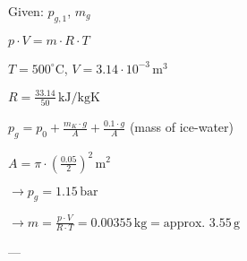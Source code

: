 Given: \( p_{g,1} \), \( m_g \)  

\( p \cdot V = m \cdot R \cdot T \)  

\( T = 500^\circ \text{C} \), \( V = 3.14 \cdot 10^{-3} \, \text{m}^3 \)  

\( R = \frac{33.14}{50} \, \text{kJ/kgK} \)  

\( p_g = p_0 + \frac{m_K \cdot g}{A} + \frac{0.1 \cdot g}{A} \) (mass of ice-water)  

\( A = \pi \cdot \left( \frac{0.05}{2} \right)^2 \, \text{m}^2 \)  

\( \rightarrow p_g = 1.15 \, \text{bar} \)  

\( \rightarrow m = \frac{p \cdot V}{R \cdot T} = 0.00355 \, \text{kg} = \text{approx. } 3.55 \, \text{g} \)  

---